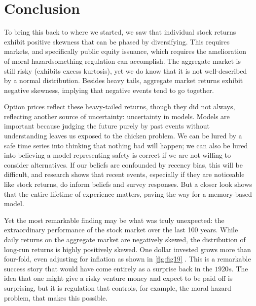 \section{Conclusion}
To bring this back to where we started, we saw that individual stock returns exhibit positive skewness that can be phased by diversifying. This requires markets, and specifically public equity issuance, which requires the amelioration of moral hazard\textemdash something regulation can accomplish. The aggregate market is still risky (exhibits excess kurtosis), yet we do know that it is not well-described by a normal distribution. Besides heavy tails, aggregate market returns exhibit negative skewness, implying that negative events tend to go together.

Option prices reflect these heavy-tailed returns, though they did not always, reflecting another source of uncertainty: uncertainty in models. Models are important because judging the future purely by past events without understanding leaves us exposed to the chicken problem. We can be lured by a safe time series into thinking that nothing bad will happen; we can also be lured into believing a model representing safety is correct if we are not willing to consider alternatives. If our beliefs are confounded by recency bias, this will be difficult, and research shows that recent events, especially if they are noticeable like stock returns, do inform beliefs and survey responses. But a closer look shows that the entire lifetime of experience matters, paving the way for a memory-based model.

Yet the most remarkable finding may be what was truly unexpected: the extraordinary performance of the stock market over the last 100 years. While daily returns on the aggregate market are negatively skewed, the distribution of long-run returns is highly positively skewed. One dollar invested grows more than four-fold, even adjusting for inflation as shown in \autoref{fig:fig19} \citep{binsbergen2023united}. This is a remarkable success story that would have come entirely as a surprise back in the $1920s$. The idea that one might give a risky venture money and expect to be paid off is surprising, but it is regulation that controls, for example, the moral hazard problem, that makes this possible.

